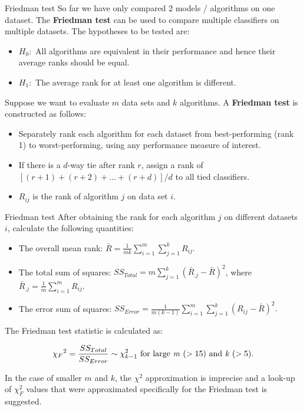 \begin{vbframe}{Friedman test}
So far we have only compared 2 models / algorithms on one dataset. The \textbf{Friedman test} can be used to compare multiple classifiers on multiple datasets. The hypotheses to be tested are:
\begin{itemize}
\item $H_0:$ All algorithms are equivalent in their performance and hence their average ranks should be equal.
\item $H_1:$ The average rank for at least one algorithm is different.
\end{itemize}

\lz
Suppose we want to evaluate $m$ data sets and $k$ algorithms. A \textbf{Friedman test} is constructed as follows:

\begin{itemize}
  \item Separately rank each algorithm for each dataset from best-performing (rank 1) to worst-performing, using any performance measure of interest.
  \item If there is a $d$-way tie after rank $r$, assign a rank of $ \left[(r+1) + (r+2) + ... + (r+d)\right] /d $ to all tied classifiers.
  \item $R_{ij}$ is the rank of algorithm $j$ on data set $i$.
\end{itemize}

\end{vbframe}

\begin{vbframe}{Friedman test}
After obtaining the rank for each algorithm $j$ on different datasets $i$, calculate the following quantities:

\begin{itemize}
  \item The overall mean rank:
  $ \bar{R} = \frac{1}{mk} \sum_{i=1}^{m} \sum_{j=1}^{k} R_{ij}. $
  \item The total sum of squares:
  $ SS_{Total} = m \sum_{j=1}^{k} (\bar{R}_{.j} - \bar{R})^2 $, where $\bar{R}_{.j} =  \frac{1}{m} \sum_{i=1}^{m} R_{ij}$.
  \item The error sum of squares:
  $ SS_{Error} = \frac{1}{m(k-1)} \sum_{i=1}^{m} \sum_{j=1}^{k} (R_{ij} - \bar{R})^2. $
\end{itemize}

\lz

The Friedman test statistic is calculated as:

$${\chi_F}^2 = \frac{SS_{Total}}{SS_{Error}} \sim \chi_{k-1}^2 \text{ for large \textit{m} ($>15$) and \textit{k} ($>5$).}$$

In the case of smaller $m$ and $k$, the $\chi^2$ approximation is imprecise and a look-up of $\chi_F^2$ values that were approximated specifically for the Friedman test is suggested.
\end{vbframe}



